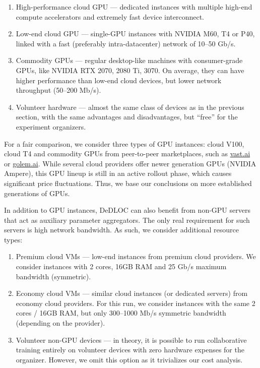 \begin{enumerate}[leftmargin=*]
    \item High-performance cloud GPU --- dedicated instances with multiple high-end compute accelerators and extremely fast device interconnect.
    \item Low-end cloud GPU --- single-GPU instances with NVIDIA M60, T4 or P40, linked with a fast (preferably intra-datacenter) network of 10--50 Gb/s.
    \item Commodity GPUs --- regular desktop-like machines with consumer-grade GPUs, like NVIDIA RTX 2070, 2080 Ti, 3070. On average, they can have higher performance than low-end cloud devices, but lower network throughput (50--200 Mb/s).
    \item Volunteer hardware --- almost the same class of devices as in the previous section, with the same advantages and disadvantages, but ``free'' for the experiment organizers.
\end{enumerate}

For a fair comparison, we consider three types of GPU instances: cloud V100, cloud T4 and commodity GPUs from peer-to-peer marketplaces, such as \url{vast.ai} or \url{golem.ai}. While several cloud providers offer newer generation GPUs (NVIDIA Ampere), this GPU lineup is still in an active rollout phase, which causes significant price fluctuations. Thus, we base our conclusions on more established generations of GPUs. 

In addition to GPU instances, DeDLOC can also benefit from non-GPU servers that act as auxiliary parameter aggregators. The only real requirement for such servers is high network bandwidth. As such, we consider additional resource types:
\begin{enumerate}[leftmargin=*]
    \item Premium cloud VMs --- low-end instances from premium cloud providers. We consider instances with 2 cores, 16GB RAM and 25 Gb/s maximum bandwidth (symmetric).
    \item Economy cloud VMs --- similar cloud instances (or dedicated servers) from economy cloud providers. For this run, we consider instances with the same 2 cores / 16GB RAM, but only 300--1000 Mb/s symmetric bandwidth (depending on the provider).
    \item Volunteer non-GPU devices --- in theory, it is possible to run collaborative training entirely on volunteer devices with zero hardware expenses for the organizer. However, we omit this option as it trivializes our cost analysis.
\end{enumerate}

